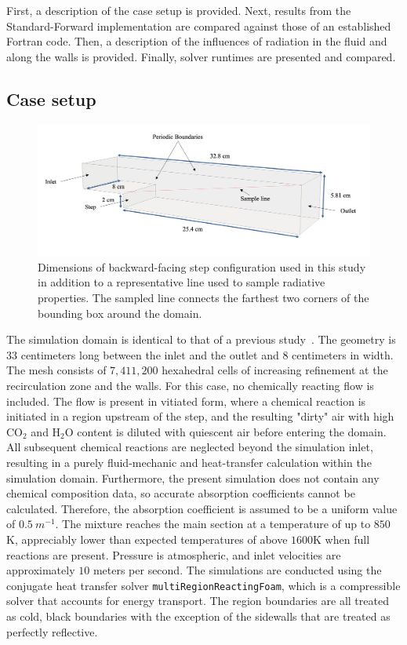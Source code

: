 First, a description of the case setup is provided. Next, results from the Standard-Forward implementation are compared against those of an established Fortran code. Then, a description of the influences of radiation in the fluid and along the walls is provided. Finally, solver runtimes are presented and compared.



\subsection{Case setup}

\begin{figure}
\includegraphics[width=\linewidth]{figures/ch4/BFS_geometry.png}
\caption{Dimensions of backward-facing step configuration used in this study in addition to a representative line used to sample radiative properties. The sampled line connects the farthest two corners of the bounding box around the domain.}
\label{fig:BFS_geometry}
\end{figure}

The simulation domain is identical to that of a previous study~\cite{Toumey2021DevelopmentTransfer}. The geometry is $33$ centimeters long between the inlet and the outlet and $8$ centimeters in width. The mesh consists of $7,411,200$ hexahedral cells of increasing refinement at the recirculation zone and the walls.
For this case, no chemically reacting flow is included. 
The flow is present in vitiated form, where a chemical reaction is initiated in a region upstream of the step, and the resulting "dirty" air with high CO$_2$ and H$_2$O content is diluted with quiescent air before entering the domain. All subsequent chemical reactions are neglected beyond the simulation inlet, resulting in a purely fluid-mechanic and heat-transfer calculation within the simulation domain. Furthermore, the present simulation does not contain any chemical composition data, so accurate absorption coefficients cannot be calculated. Therefore, the absorption coefficient is assumed to be a uniform value of $0.5~m^{-1}$.
The mixture reaches the main section at a temperature of up to $850$K, appreciably lower than expected temperatures of above $1600$K when full reactions are present. Pressure is atmospheric, and inlet velocities are approximately $10$ meters per second.
The simulations are conducted using the conjugate heat transfer solver \texttt{multiRegionReactingFoam}, which is a compressible solver that accounts for energy transport. The region boundaries are all treated as cold, black boundaries with the exception of the sidewalls that are treated as perfectly reflective.



